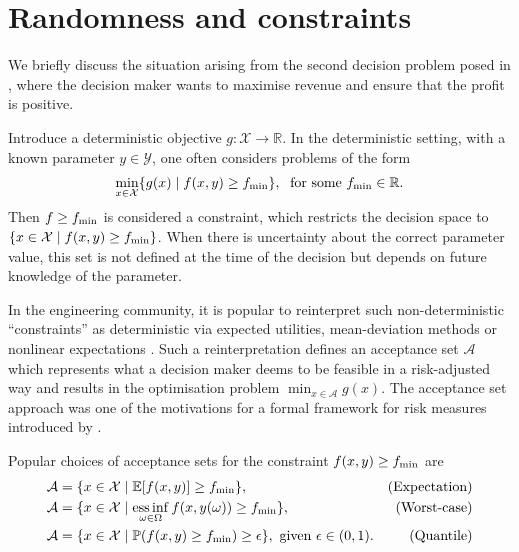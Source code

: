 \documentclass[main.tex]{subfiles}
\begin{document}
\section{Randomness and
  constraints}\label{sec:one_randomness_constraints}
We briefly discuss the situation arising from the
second decision problem posed in ,
where the decision maker wants to maximise revenue and ensure that
the profit is positive.

Introduce a deterministic objective $g:\mathcal{X}
\to\mathbb{R}$. In the deterministic setting, with a known parameter
$y\in\mathcal{Y}$, one often considers problems of the form
\begin{align}
  \min_{x\in\mathcal{X}}\{g(x)\mid f(x,y)\geq f_{\textnormal{min}} \},\;
  \text{ for some } f_{\textnormal{min}}\in\mathbb{R}.
\end{align}
Then $f\geq f_{\textnormal{min}}$ is considered a constraint, which restricts the
decision space to $\{x\in\mathcal{X}\mid f(x,y)\geq f_{\textnormal{min}}\}$.
When there is uncertainty about the correct parameter value, this set is
not defined at the time of the decision but depends on future knowledge
of the parameter.

In the engineering community, it is popular to
reinterpret such non-deterministic ``constraints'' as deterministic via
expected utilities, mean-deviation methods or nonlinear
expectations
\citep{rockafellar2007coherent,rockafellar2015engineering}.
Such a reinterpretation defines an acceptance set $\mathcal{A}$
which represents what a decision maker deems to be feasible in a
risk-adjusted way and results in the optimisation problem
$\min_{x\in\mathcal{A}} g(x)$.
The acceptance set approach was one of the motivations for a formal
framework for risk measures introduced by \citet{artzner1999coherent}.
\begin{example}
  Popular choices of acceptance sets for the constraint $f(x,y)\geq
  f_{\textnormal{min}}$ are
  \begin{align}
    \mathcal{A}&=\{x\in\mathcal{X} \mid
                 \mathbb{E}[f(x,y)]\geq f_{\textnormal{min}}\},
    &\textnormal{(Expectation)}\\
    \mathcal{A}&=\{x\in\mathcal{X} \mid
                 \operatorname*{ess\,inf}_{\omega\in\Omega}f(x,y(\omega))\geq
                 f_{\textnormal{min}}\},
    &\textnormal{(Worst-case)}\\
    \mathcal{A} &= \{x\in\mathcal{X}\mid
                  \mathbb{P}(f(x,y)\geq f_{\textnormal{min}})\geq \epsilon\},
                  \text{ given }\epsilon\in(0,1).
    &\textnormal{(Quantile)}
  \end{align}
\end{example}
\end{document}
